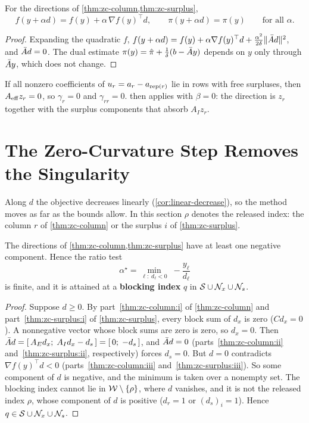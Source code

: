 \begin{cor} \label{cor:linear-decrease}
For the directions of \cref{thm:zc-column,thm:zc-surplus},
\[
f(y + \alpha d) = f(y) + \alpha\,\nabla f(y)^\top d,\qquad \pi(y+\alpha d) = \pi(y)
\qquad\text{for all }\alpha .
\]
\end{cor}

\begin{proof}
Expanding the quadratic $f$, $f(y+\alpha d) = f(y) + \alpha\nabla f(y)^\top d +
\frac{\alpha^2}{2\delta}\lVert\bar{A} d\rVert^2$, and $\bar{A} d = 0$. The dual estimate
$\pi(y) = \hat{\pi} + \frac{1}{\delta}(b - \bar{A} y)$ depends on $y$ only through $\bar{A} y$, which does
not change.
\end{proof}

\begin{remark} \label{rem:masked-column}
If all nonzero coefficients of $u_r = a_r - a_{\operatorname{rep}(r)}$ lie in rows with free surpluses, then
$A_{\mathrm{eff}} z_r = 0$, so $\gamma_r = 0$ and $\gamma_{rr} = 0$.  then applies with $\beta = 0$:
the direction is $z_r$ together with the surplus components that absorb $A_Iz_r$.
\end{remark}


\section{The Zero-Curvature Step Removes the Singularity}
\label{sec:zc-step}

Along $d$ the objective decreases linearly (\cref{cor:linear-decrease}), so the method moves
as far as the bounds allow. In this section $\rho$ denotes the released index: the column $r$ of
\cref{thm:zc-column} or the surplus $i$ of \cref{thm:zc-surplus}.

\begin{lemma} \label{lem:finite-step}
The directions of \cref{thm:zc-column,thm:zc-surplus} have at least one negative component.
Hence the ratio test
\[
\alpha^\star = \min_{\ell:\;d_\ell<0}\;-\frac{y_\ell}{d_\ell}
\]
is finite, and it is attained at a \textbf{blocking index} $q$ in
$\mathcal{S}\cup\mathcal{N}_x\cup\mathcal{N}_s$.
\end{lemma}

\begin{proof}
Suppose $d\ge0$. By part~\ref{thm:zc-column:i} of \cref{thm:zc-column} and part~\ref{thm:zc-surplus:i} of \cref{thm:zc-surplus}, every block sum of $d_x$ is zero ($Cd_x = 0$).
A nonnegative vector whose block sums are zero is zero, so $d_x = 0$. Then
$\bar{A} d = [\,A_Ed_x;\; A_Id_x - d_s\,] = [\,0;\;-d_s\,]$, and $\bar{A} d = 0$ (parts~\ref{thm:zc-column:ii} and~\ref{thm:zc-surplus:ii}, respectively) forces
$d_s = 0$. But $d = 0$ contradicts $\nabla f(y)^\top d < 0$ (parts~\ref{thm:zc-column:iii} and~\ref{thm:zc-surplus:iii}). So some component of
$d$ is negative, and the minimum is taken over a nonempty set. The blocking index cannot lie in
$\mathcal{W}\setminus\{\rho\}$, where $d$ vanishes, and it is not the released index $\rho$, whose
component of $d$ is positive ($d_r = 1$ or $(d_s)_i = 1$). Hence $q\in\mathcal{S}\cup\mathcal{N}_x\cup\mathcal{N}_s$.
\end{proof}

